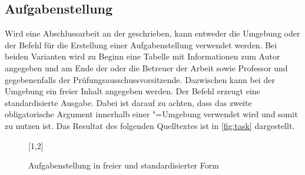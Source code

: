 \documentclass[english,ngerman]{tudscrartcl}
\begin{document}
\subsection{Aufgabenstellung}
\label{sec:task}
Wird eine Abschlussarbeit an der \TnUD geschrieben, kann entweder die Umgebung 
 oder der Befehl  für die Erstellung einer 
Aufgabenstellung verwendet werden. Bei beiden Varianten wird zu Beginn eine 
Tabelle mit Informationen zum Autor angegeben und am Ende der oder die Betreuer 
der Arbeit sowie Professor und gegebenenfalls der Prüfungsausschussvorsitzende. 
Dazwischen kann bei der Umgebung  ein freier Inhalt angegeben 
werden. Der Befehl  erzeugt eine standardisierte Ausgabe. Dabei 
ist darauf zu achten, dass das zweite obligatorische Argument innerhalb einer 
"=Umgebung verwendet wird und somit  zu 
nutzen ist. Das Resultat des folgenden Quelltextes ist in \autoref{fig:task} 
dargestellt.
\begin{figure}
[1,2]
\caption{Aufgabenstellung in freier und standardisierter Form}
\label{fig:task}
\end{figure}
\end{document}

